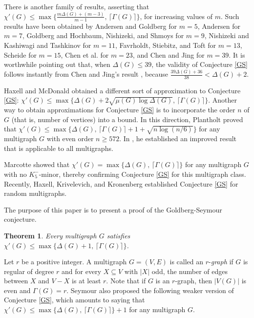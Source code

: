 \documentclass[11pt]{article}
\newtheorem{theorem}{Theorem}[section]
\begin{document}
There is another family of results, asserting that $\chi'(G)\le \max\{\frac{m \Delta(G)+(m-3)}{m-1}, \, \lceil \Gamma(G) 
\rceil\}$, for increasing values of $m$. Such results have been obtained by Andersen \cite{An77} and  Goldberg \cite{G73} 
for $m=5$, Andersen \cite{An77} for $m=7$, Goldberg \cite{G84} and Hochbaum, Nishizeki, and Shmoys \cite{HNS86} for $m=9$, 
Nishizeki and Kashiwagi \cite{NK} and Tashkinov \cite{T} for $m=11$, Favrholdt, Stiebitz, and Toft \cite{FST} for $m=13$, 
Scheide \cite{S} for $m=15$,  Chen et al. \cite{GT} for $m=23$, and Chen and Jing \cite{GG} for $m=39$. It is
worthwhile pointing out that, when $\Delta(G) \le 39$, the validity of Conjecture \ref{GS} follows instantly from  
Chen and Jing's result \cite{GG}, because $\frac{39 \Delta(G)+36}{38}<\Delta(G)+2$.  

Haxell and McDonald \cite{HM} obtained a different sort of approximation to Conjecture \ref{GS}: $\chi'(G)\le \max\{\Delta(G)+
2 \sqrt{\mu(G) \log \Delta(G)}, \, \lceil \Gamma(G) \rceil\}$. Another way to obtain approximations for Conjecture \ref{GS}
is to incorporate the order $n$ of $G$ (that is, number of vertices) into a bound. In this direction, Plantholt \cite{P99}
proved that $\chi'(G)\le \max\{\Delta(G),  \, \lceil \Gamma(G) \rceil+1+ \sqrt{n \log (n/6)}\}$ for any multigraph
$G$ with even order $n\ge 572$. In \cite{P13}, he established an improved result that is applicable to all multigraphs.   

Marcotte \cite{M} showed that $\chi'(G)=\max\{\Delta(G), \, \lceil \Gamma(G) \rceil\}$ for any multigraph $G$ with no 
$K_5^-$-minor, thereby confirming Conjecture \ref{GS} for this multigraph class. Recently, Haxell, Krivelevich, and 
Kronenberg \cite{HKK} established Conjecture \ref{GS} for random multigraphs. 

The purpose of this paper is to present a proof of the Goldberg-Seymour conjecture. 

\begin{theorem} \label{ThmGS}
	Every multigraph $G$ satisfies $\chi'(G)\le \max\{\Delta(G)+1, \, \lceil \Gamma(G) \rceil\}$.
\end{theorem} 

Let $r$ be a positive integer. A multigraph $G=(V,E)$ is called an $r$-{\em graph} if $G$
is regular of degree $r$ and for every $X \subseteq V$ with $|X|$ odd, the number of edges
between $X$ and $V-X$ is at least $r$. Note that if $G$ is an $r$-graph, then $|V(G)|$ is even
and $\Gamma(G)=r$. Seymour \cite{Se} also proposed the following weaker version of Conjecture 
\ref{GS}, which amounts to saying that $\chi'(G)\le \max\{\Delta(G), \, \lceil \Gamma(G) \rceil\}+1$ for 
any multigraph $G$.
\end{document}
